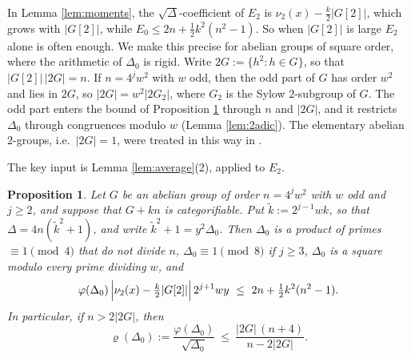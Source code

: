\documentclass[10pt]{article}
\theoremstyle{plain}
\newtheorem{proposition}[theorem]{Proposition}
\theoremstyle{definition}
\theoremstyle{plain}
\begin{document}
In Lemma \ref{lem:moments}, the $\sqrt\Delta$-coefficient of $E_2$ is $\nu_2(x)-\frac k2|G[2]|$, which grows with $|G[2]|$, while $E_0\leq2n+\frac12k^2(n^2-1)$. So when $|G[2]|$ is large $E_2$ alone is often enough. We make this precise for abelian groups of square order, where the arithmetic of $\Delta_0$ is rigid. Write $2G:=\{h^2:h\in G\}$, so that $|G[2]|\,|2G|=n$. If $n=4^jw^2$ with $w$ odd, then the odd part of $G$ has order $w^2$ and lies in $2G$, so $|2G|=w^2|2G_2|$, where $G_2$ is the Sylow $2$-subgroup of $G$. The odd part enters the bound of Proposition \ref{prop:2groups} through $n$ and $|2G|$, and it restricts $\Delta_0$ through congruences modulo $w$ (Lemma \ref{lem:2adic}). The elementary abelian $2$-groups, i.e.\ $|2G|=1$, were treated in this way in \cite[Section 4.2]{MR4655273}.

The key input is Lemma \ref{lem:average}(2), applied to $E_2$.

\begin{proposition}\label{prop:2groups}
Let $G$ be an abelian group of order $n=4^jw^2$ with $w$ odd and $j\geq2$, and suppose that $G+kn$ is categorifiable. Put $\tilde k:=2^{j-1}wk$, so that $\Delta=4n(\tilde k^2+1)$, and write $\tilde k^2+1=y^2\Delta_0$. Then $\Delta_0$ is a product of primes $\equiv1\pmod4$ that do not divide $n$, $\Delta_0\equiv1\pmod8$ if $j\geq3$, $\Delta_0$ is a square modulo every prime dividing $w$, and
\begin{equation}\label{eq:2groups}
\varphi(\Delta_0)\,\Bigl|\nu_2(x)-\tfrac k2|G[2]|\Bigr|\,2^{j+1}wy\ \leq\ 2n+\tfrac12k^2(n^2-1).
\end{equation}
In particular, if $n>2|2G|$, then
\[
\varrho(\Delta_0):=\frac{\varphi(\Delta_0)}{\sqrt{\Delta_0}}\ \leq\ \frac{|2G|\,(n+4)}{n-2|2G|}.
\]
\end{proposition}
\end{document}
